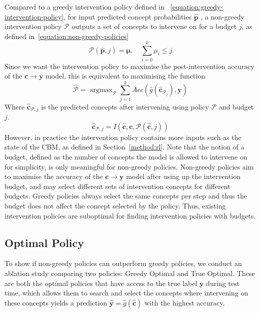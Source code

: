 Compared to a greedy intervention policy
defined in ~\ref{equation:greedy-intervention-policy}, for input predicted concept probabilities
$\hat{\mathbf{p}}$
, a non-greedy intervention 
policy $\mathcal{P}$ outputs a set of concepts to intervene on for a budget $j$, as defined in~\ref{equation:non-greedy-policies}
\begin{equation}\label{equation:non-greedy-policies}
\mathcal{P}(\hat{\mathbf{p}}, j) = \bm{\mu}, \quad \sum_{i=0}^k \mu_i \leq j
\end{equation}
Since we want the intervention policy to maximise 
the post-intervention accuracy of the $\mathbf{c} \to \mathbf{y}$ model, this is equivalent to maximising 
the function
\begin{equation}\label{equation:non-greedy-policies}
\hat{\mathcal{P}} = \mathop{\mathrm{argmax}}_{\mathcal{P}} \sum_{j=1}^k Acc(\hat{g}(\hat{\mathbf{c}}_{\mathcal{P}_j}), \mathbf{y}) 
\end{equation}
Where $\hat{\mathbf{c}}_{\mathcal{P}, j}$ is the predicted concepts after intervening using policy $\mathcal{P}$ and budget $j$.
\begin{equation}\label{equation:non-greedy-policies-max-2}
\hat{\mathbf{c}}_{\mathcal{P}, j} = I(\hat{\mathbf{c}}, \mathbf{c}, \mathcal{P}(\hat{\mathbf{c}}, j))
\end{equation}
However, in practice the intervention policy
contains more inputs such as the state of the CBM, as defined in Section~\ref{method:rl}.
Note that the notion of a budget, defined as the number
of concepts the model is allowed to intervene on for simplicity, is only
meaningful for non-greedy policies. Non-greedy policies aim
to maximise the accuracy of the $\mathbf{c} \to \mathbf{y}$ model after using up the intervention budget,
and may select different sets of intervention concepts 
for different budgets. Greedy policies always select the same
concepts per step and thus the budget does not 
affect the concept selected by the policy.
Thus, existing intervention policies are suboptimal for finding intervention policies 
with budgets.

\subsection{Optimal Policy}
To show if non-greedy policies can outperform greedy policies, we conduct an
ablation study comparing two policies:
Greedy Optimal and True Optimal.
These are both the optimal policies that have access to the true label $\mathbf{y}$ during test time, which 
allows them to search and select the concepts
where intervening on these concepts yields a prediction
$\hat{\mathbf{y}} = \hat{g}(\hat{\mathbf{c}})$ 
with the highest accuracy.

